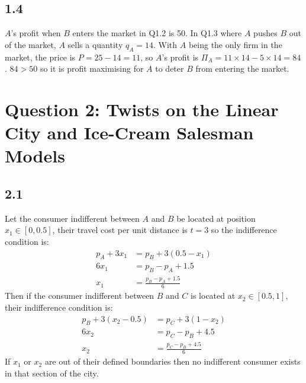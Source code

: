 \documentclass{article}
\begin{document}
\subsection*{1.4}
$A$'s profit when $B$ enters the market in Q1.2 is 50. In Q1.3 where $A$ pushes $B$ out of the market, $A$ sells a quantity $q_{A} = 14$. With $A$ being the only firm in the market, the price is $P = 25 - 14 = 11$, so $A$'s profit is $\Pi_{A} = 11 \times 14 - 5 \times 14 = 84$. $84 > 50$ so it is profit maximising for $A$ to deter $B$ from entering the market.

\section*{Question 2: Twists on the Linear City and Ice-Cream Salesman Models}
\subsection*{2.1}
Let the consumer indifferent between $A$ and $B$ be located at position $x_{1} \in [0, 0.5]$, their travel cost per unit distance is $t=3$ so the indifference condition is:
\begin{align*}
    p_{A} + 3x_{1} &= p_{B} + 3(0.5 - x_{1})\\
    6x_{1} &= p_{B} - p_{A} + 1.5\\
    x_{1} &= \frac{p_{B} - p_{A} + 1.5}{6}
\end{align*}
Then if the consumer indifferent between $B$ and $C$ is located at $x_{2} \in [0.5, 1]$, their indifference condition is:
\begin{align*}
    p_{B} + 3(x_{2} - 0.5) &= p_{C} + 3(1 - x_{2})\\
    6x_{2} &= p_{C} - p_{B} + 4.5\\
    x_{2} &= \frac{p_{C} - p_{B} + 4.5}{6}
\end{align*}
If $x_{1}$ or $x_{2}$ are out of their defined boundaries then no indifferent consumer exists in that section of the city.
\end{document}
